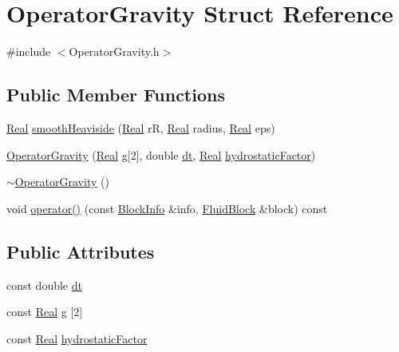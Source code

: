 \hypertarget{struct_operator_gravity}{}\section{Operator\+Gravity Struct Reference}
\label{struct_operator_gravity}


{\ttfamily \#include $<$Operator\+Gravity.\+h$>$}

\subsection*{Public Member Functions}
\begin{DoxyCompactItemize}
\item 
\hyperlink{_h_d_f5_dumper_8h_a445a5f0e2a34c9d97d69a3c2d1957907}{Real} \hyperlink{struct_operator_gravity_a75dcdc5463be12de4c3c7f6a271fc6b9}{smooth\+Heaviside} (\hyperlink{_h_d_f5_dumper_8h_a445a5f0e2a34c9d97d69a3c2d1957907}{Real} r\+R, \hyperlink{_h_d_f5_dumper_8h_a445a5f0e2a34c9d97d69a3c2d1957907}{Real} radius, \hyperlink{_h_d_f5_dumper_8h_a445a5f0e2a34c9d97d69a3c2d1957907}{Real} eps)
\item 
\hyperlink{struct_operator_gravity_a3c5e4b3a171dab9dac4606a667252018}{Operator\+Gravity} (\hyperlink{_h_d_f5_dumper_8h_a445a5f0e2a34c9d97d69a3c2d1957907}{Real} \hyperlink{struct_operator_gravity_aa63b78a733552761f6a5624cb57a6560}{g}\mbox{[}2\mbox{]}, double \hyperlink{struct_operator_gravity_a0a6860e7beb6a636eb7c8bd1fc8c8818}{dt}, \hyperlink{_h_d_f5_dumper_8h_a445a5f0e2a34c9d97d69a3c2d1957907}{Real} \hyperlink{struct_operator_gravity_a0981f7c8369f7659c127c30743cb1827}{hydrostatic\+Factor})
\item 
\hyperlink{struct_operator_gravity_a30a6b4f54bfd10d91064d5e48183038e}{$\sim$\+Operator\+Gravity} ()
\item 
void \hyperlink{struct_operator_gravity_a7829a016bf4b27c2213493e363515c90}{operator()} (const \hyperlink{struct_block_info}{Block\+Info} \&info, \hyperlink{struct_fluid_block}{Fluid\+Block} \&block) const 
\end{DoxyCompactItemize}
\subsection*{Public Attributes}
\begin{DoxyCompactItemize}
\item 
const double \hyperlink{struct_operator_gravity_a0a6860e7beb6a636eb7c8bd1fc8c8818}{dt}
\item 
const \hyperlink{_h_d_f5_dumper_8h_a445a5f0e2a34c9d97d69a3c2d1957907}{Real} \hyperlink{struct_operator_gravity_aa63b78a733552761f6a5624cb57a6560}{g} \mbox{[}2\mbox{]}
\item 
const \hyperlink{_h_d_f5_dumper_8h_a445a5f0e2a34c9d97d69a3c2d1957907}{Real} \hyperlink{struct_operator_gravity_a0981f7c8369f7659c127c30743cb1827}{hydrostatic\+Factor}
\end{DoxyCompactItemize}


